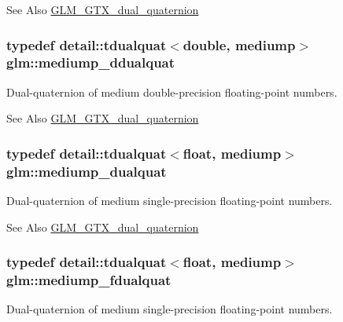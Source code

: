 \begin{DoxySeeAlso}{See Also}
\hyperlink{group__gtc__dual__quaternion}{G\-L\-M\-\_\-\-G\-T\-X\-\_\-dual\-\_\-quaternion} 
\end{DoxySeeAlso}
\hypertarget{group__gtc__dual__quaternion_ga62d8cbf30e2afd0b1044204268a69066}{
\subsubsection[{mediump\-\_\-ddualquat}]{\setlength{\rightskip}{0pt plus 5cm}typedef detail\-::tdualquat$<$double, mediump$>$ {\bf glm\-::mediump\-\_\-ddualquat}}}\label{group__gtc__dual__quaternion_ga62d8cbf30e2afd0b1044204268a69066}
Dual-\/quaternion of medium double-\/precision floating-\/point numbers.

\begin{DoxySeeAlso}{See Also}
\hyperlink{group__gtc__dual__quaternion}{G\-L\-M\-\_\-\-G\-T\-X\-\_\-dual\-\_\-quaternion} 
\end{DoxySeeAlso}
\hypertarget{group__gtc__dual__quaternion_ga71fc1c10a382330c1fee55ce29703405}{
\subsubsection[{mediump\-\_\-dualquat}]{\setlength{\rightskip}{0pt plus 5cm}typedef detail\-::tdualquat$<$float, mediump$>$ {\bf glm\-::mediump\-\_\-dualquat}}}\label{group__gtc__dual__quaternion_ga71fc1c10a382330c1fee55ce29703405}
Dual-\/quaternion of medium single-\/precision floating-\/point numbers.

\begin{DoxySeeAlso}{See Also}
\hyperlink{group__gtc__dual__quaternion}{G\-L\-M\-\_\-\-G\-T\-X\-\_\-dual\-\_\-quaternion} 
\end{DoxySeeAlso}
\hypertarget{group__gtc__dual__quaternion_gab211d24786158490e57dfa57d7744f71}{
\subsubsection[{mediump\-\_\-fdualquat}]{\setlength{\rightskip}{0pt plus 5cm}typedef detail\-::tdualquat$<$float, mediump$>$ {\bf glm\-::mediump\-\_\-fdualquat}}}\label{group__gtc__dual__quaternion_gab211d24786158490e57dfa57d7744f71}
Dual-\/quaternion of medium single-\/precision floating-\/point numbers.

